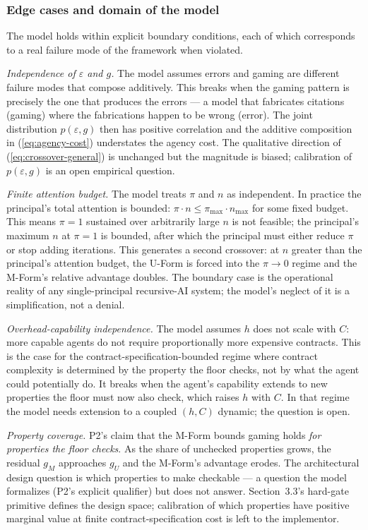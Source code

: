 \documentclass[11pt]{article}
\begin{document}
\subsubsection{Edge cases and domain of the model}

The model holds within explicit boundary conditions, each of which corresponds to a real failure mode of the framework when violated.

\emph{Independence of $\varepsilon$ and $g$.} The model assumes errors and gaming are different failure modes that compose additively. This breaks when the gaming pattern is precisely the one that produces the errors --- a model that fabricates citations (gaming) where the fabrications happen to be wrong (error). The joint distribution $p(\varepsilon, g)$ then has positive correlation and the additive composition in (\ref{eq:agency-cost}) understates the agency cost. The qualitative direction of (\ref{eq:crossover-general}) is unchanged but the magnitude is biased; calibration of $p(\varepsilon, g)$ is an open empirical question.

\emph{Finite attention budget.} The model treats $\pi$ and $n$ as independent. In practice the principal's total attention is bounded: $\pi \cdot n \leq \pi_{\max} \cdot n_{\max}$ for some fixed budget. This means $\pi = 1$ sustained over arbitrarily large $n$ is not feasible; the principal's maximum $n$ at $\pi = 1$ is bounded, after which the principal must either reduce $\pi$ or stop adding iterations. This generates a second crossover: at $n$ greater than the principal's attention budget, the U-Form is forced into the $\pi \to 0$ regime and the M-Form's relative advantage doubles. The boundary case is the operational reality of any single-principal recursive-AI system; the model's neglect of it is a simplification, not a denial.

\emph{Overhead-capability independence.} The model assumes $h$ does not scale with $C$: more capable agents do not require proportionally more expensive contracts. This is the case for the contract-specification-bounded regime where contract complexity is determined by the property the floor checks, not by what the agent could potentially do. It breaks when the agent's capability extends to new properties the floor must now also check, which raises $h$ with $C$. In that regime the model needs extension to a coupled $(h, C)$ dynamic; the question is open.

\emph{Property coverage.} P2's claim that the M-Form bounds gaming holds \emph{for properties the floor checks}. As the share of unchecked properties grows, the residual $g_M$ approaches $g_U$ and the M-Form's advantage erodes. The architectural design question is which properties to make checkable --- a question the model formalizes (P2's explicit qualifier) but does not answer. Section~3.3's hard-gate primitive defines the design space; calibration of which properties have positive marginal value at finite contract-specification cost is left to the implementor.
\end{document}
